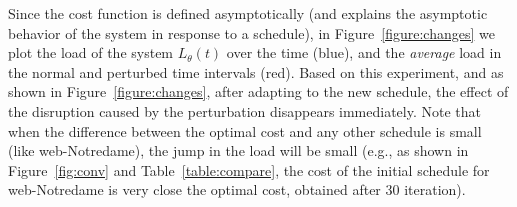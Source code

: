 Since the cost function is defined asymptotically (and explains the asymptotic
behavior of the system in response to a schedule), in
Figure~\ref{figure:changes} we plot the load of the system $L_\theta(t)$ over
the time (blue), and the \emph{average} load in the normal and perturbed time
intervals (red). Based on this experiment, and as shown in
Figure~\ref{figure:changes}, after adapting to the new schedule, the effect of
the disruption caused by the perturbation disappears immediately. Note that when
the difference between the optimal cost and any other schedule is small (like
web-Notredame), the jump in the load will be small (e.g., as shown in
Figure~\ref{fig:conv} and Table~\ref{table:compare}, the cost of the initial
schedule for web-Notredame is very close the optimal cost, obtained after 30
iteration).




